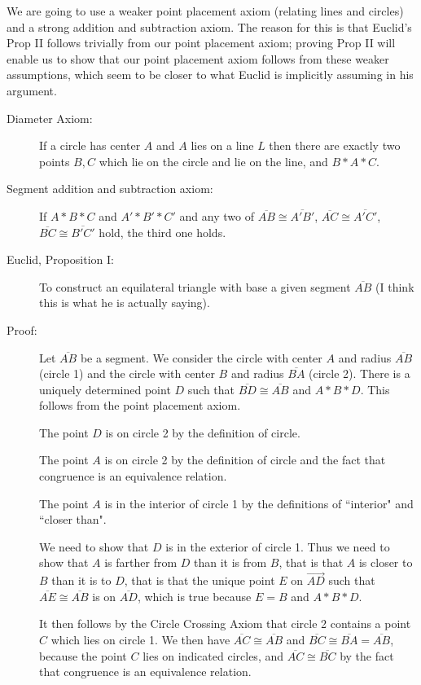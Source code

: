 \documentclass[12pt]{article}
\begin{document}
We are going to use a weaker point placement axiom (relating lines and circles) and a strong addition and subtraction axiom.  The reason for this is that Euclid's Prop II
follows trivially from our point placement axiom;  proving Prop II will enable us to show that our point placement axiom follows from these weaker assumptions, which seem to be
closer to what Euclid is implicitly assuming in his argument.

\begin{description}

\item[Diameter Axiom:]  If a circle has center $A$ and $A$ lies on a line $L$ then there are exactly two points $B,C$ which lie on the circle and lie on the line, and $B*A*C$.

\item[Segment addition and subtraction axiom:]  If $A*B*C$ and $A'*B'*C'$ and any two of $\overline{AB} \cong \overline{A'B'}$, $\overline{AC} \cong \overline{A'C'}$, $\overline{BC} \cong \overline{B'C'}$ hold, the third one holds.


\item[Euclid, Proposition I:]  To construct an equilateral triangle with base a given segment $\overline{AB}$ (I think this is what he is actually saying).

\item[Proof:]  Let $\overline{AB}$ be a segment.  We consider the circle with center $A$ and radius $\overline{AB}$ (circle 1) and the circle with center $B$ and radius $\overline{BA}$ (circle 2).
There is a uniquely determined point $D$ such that $\overline{BD} \cong \overline{AB}$ and $A*B*D$.  This follows from the point placement axiom.

The point $D$ is on circle 2 by the definition of circle.

The point $A$ is on circle 2 by the definition of circle and the fact that congruence is an equivalence relation.

The point $A$ is in the interior of circle 1 by the definitions of ``interior" and ``closer than".

We need to show that $D$ is in the exterior of circle 1.  Thus we need to show that $A$ is farther from $D$ than it is from $B$, that is that $A$ is closer to $B$ than it is to $D$,
that is that the unique point $E$ on $\overrightarrow{AD}$ such that $\overline{AE} \cong \overline{AB}$ is on $\overline{AD}$, which is true  because $E=B$ and $A*B*D$.

It then follows by the Circle Crossing Axiom that circle 2 contains a point $C$ which lies on circle 1.  We then have $\overline{AC} \cong \overline{AB}$ and $\overline{BC} \cong \overline{BA}= \overline{AB}$, because the point $C$ lies on indicated circles, and $\overline{AC}\cong \overline{BC}$ by the fact that congruence is an equivalence relation.


\end{description}
\end{document}
